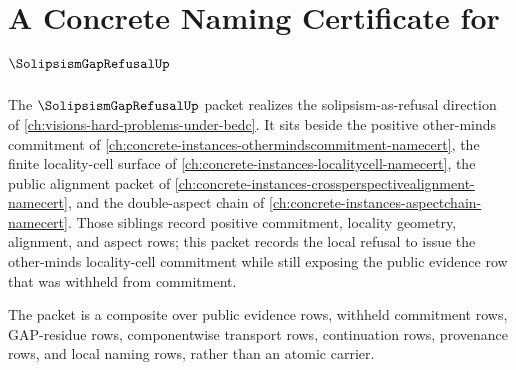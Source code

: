 \chapter{A Concrete Naming Certificate for $\SolipsismGapRefusalUp$}
\label{ch:concrete-instances-solipsismgaprefusal-namecert}

The $\SolipsismGapRefusalUp$ packet realizes the solipsism-as-refusal direction of \autoref{ch:visions-hard-problems-under-bedc}. It sits beside the positive other-minds commitment of \autoref{ch:concrete-instances-othermindscommitment-namecert}, the finite locality-cell surface of \autoref{ch:concrete-instances-localitycell-namecert}, the public alignment packet of \autoref{ch:concrete-instances-crossperspectivealignment-namecert}, and the double-aspect chain of \autoref{ch:concrete-instances-aspectchain-namecert}. Those siblings record positive commitment, locality geometry, alignment, and aspect rows; this packet records the local refusal to issue the other-minds locality-cell commitment while still exposing the public evidence row that was withheld from commitment.

The packet is a composite over public evidence rows, withheld commitment rows, GAP-residue rows, componentwise transport rows, continuation rows, provenance rows, and local naming rows, rather than an atomic carrier.

